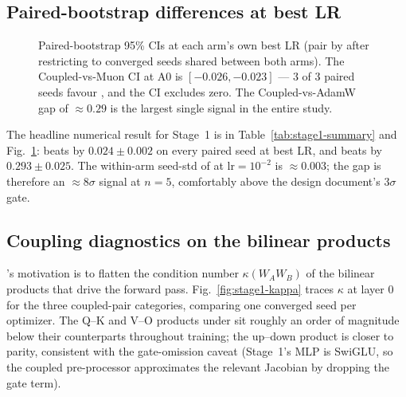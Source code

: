 \subsection{Paired-bootstrap differences at best LR}

\begin{table}[h]
\centering
\caption{Stage~1 best-LR summary. \optMuon{}'s small $n_{\mathrm{conv}}$ at $\mathrm{lr}{=}10^{-2}$ reflects 2 of 5 seeds diverging at the same hyper-parameter.}\label{tab:stage1-summary}
\end{table}

\begin{figure}[h]
\centering
{}
\caption{Paired-bootstrap 95\% CIs at each arm's own best LR (pair by  after restricting to converged seeds shared between both arms). The Coupled-vs-Muon CI at A0 is $[-0.026, -0.023]$\nats{} --- 3 of 3 paired seeds favour \optCoupled, and the CI excludes zero. The Coupled-vs-AdamW gap of $\approx 0.29$\nats{} is the largest single signal in the entire study.}\label{fig:stage1-forest}
\end{figure}

The headline numerical result for Stage~1 is in Table~\ref{tab:stage1-summary} and Fig.~\ref{fig:stage1-forest}: \optCoupled{} beats \optMuon{} by $0.024 \pm 0.002$\nats{} on every paired seed at best LR, and beats \optAdamW{} by $0.293 \pm 0.025$\nats{}. The within-arm seed-std of \optCoupled{} at $\mathrm{lr}{=}10^{-2}$ is $\approx 0.003$\nats; the gap is therefore an $\approx 8\sigma$ signal at $n{=}5$, comfortably above the design document's $3\sigma$ gate.

\subsection{Coupling diagnostics on the bilinear products}

\optCoupled{}'s motivation is to flatten the condition number $\kappa(W_A W_B)$ of the bilinear products that drive the forward pass. Fig.~\ref{fig:stage1-kappa} traces $\kappa$ at layer 0 for the three coupled-pair categories, comparing one converged seed per optimizer. The Q--K and V--O products under \optCoupled{} sit roughly an order of magnitude below their \optMuon{} counterparts throughout training; the up--down product is closer to parity, consistent with the gate-omission caveat (Stage~1's MLP is SwiGLU, so the coupled pre-processor approximates the relevant Jacobian by dropping the gate term).

